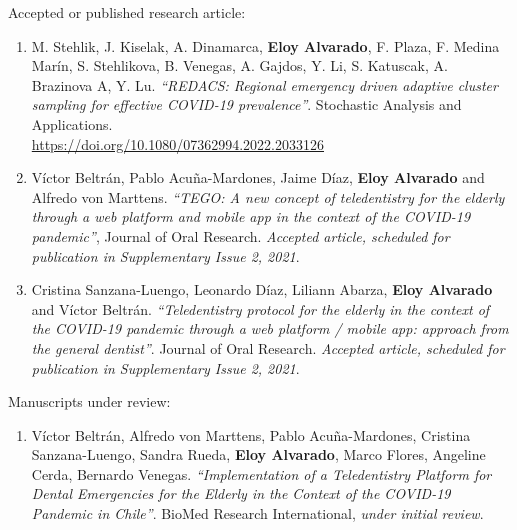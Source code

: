 \documentclass[10pt,a4paper]{article}
\begin{document}
\headedsubsection 
{Accepted or published research article:}{}
{
\begin{enumerate}

\item M. Stehlik, J. Kiselak, A. Dinamarca, \textbf{Eloy Alvarado}, F. Plaza, F. Medina Marín, S. Stehlikova, B. Venegas, A. Gajdos, Y. Li, S. Katuscak, A. Brazinova A, Y. Lu. \textit{``REDACS: Regional emergency driven adaptive cluster sampling for effective COVID-19 prevalence''}. Stochastic Analysis and Applications.\\ \href{https://doi.org/10.1080/07362994.2022.2033126}{https://doi.org/10.1080/07362994.2022.2033126}

\item Víctor Beltrán, Pablo Acuña-Mardones, Jaime Díaz, \textbf{Eloy Alvarado} and Alfredo von Marttens. \textit{``TEGO: A new concept of teledentistry for the elderly through a web platform and mobile app in the context of the COVID-19 pandemic''}, Journal of Oral Research. \textit{Accepted article, scheduled for publication in Supplementary Issue 2, 2021}.

\item Cristina Sanzana-Luengo, Leonardo Díaz, Liliann Abarza, \textbf{Eloy Alvarado} and Víctor Beltrán. \textit{``Teledentistry protocol for the elderly in the context of the COVID-19 pandemic through a web platform / mobile app: approach from the general dentist''}. Journal of Oral Research. \textit{Accepted article, scheduled for publication in Supplementary Issue 2, 2021}.
\end{enumerate}
}

\headedsubsection 
{Manuscripts under review:}{}
{\begin{enumerate}

\item Víctor Beltrán, Alfredo von Marttens, Pablo Acuña-Mardones, Cristina Sanzana-Luengo, Sandra Rueda, \textbf{Eloy Alvarado}, Marco Flores, Angeline Cerda, Bernardo Venegas. \textit{``Implementation of a Teledentistry Platform for Dental Emergencies for the Elderly in the Context of the COVID-19 Pandemic in Chile''}. BioMed Research International, \textit{under initial review}.
\end{enumerate}
}

\end{document}
